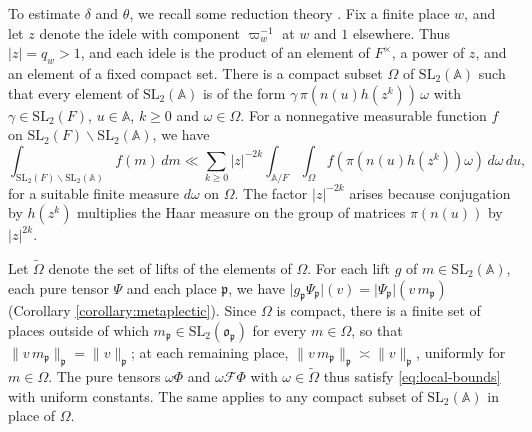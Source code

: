 \documentclass[reqno]{amsart}
\theoremstyle{plain}
\theoremstyle{definition}
\theoremstyle{itplain}
\numberwithin{equation}{section}
\numberwithin{theorem}{section}
\begin{document}
To estimate $\delta$ and $\theta$, we recall some reduction theory \cite[I.2.1]{MR1361168}.  Fix a finite place $w$, and let $z$ denote the idele with component $\varpi_w^{-1}$ at $w$ and $1$ elsewhere.  Thus $\lvert z \rvert = q_w > 1$, and each idele is the product of an element of $F^\times$, a power of $z$, and an element of a fixed compact set.  There is a compact subset $\Omega$ of $\mathrm{SL}_2(\mathbb{A})$ such that every element of $\mathrm{SL}_2(\mathbb{A})$ is of the form $\gamma \, \pi(n(u) h(z^k)) \, \omega$ with $\gamma \in \mathrm{SL}_2(F)$, $u \in \mathbb{A}$, $k \geq 0$ and $\omega \in \Omega$.  For a nonnegative measurable function $f$ on $\mathrm{SL}_2(F) \backslash \mathrm{SL}_2(\mathbb{A})$, we have
\begin{equation}\label{eq:siegel}
  \int_{\mathrm{SL}_2(F) \backslash \mathrm{SL}_2(\mathbb{A})} f(m) \, d m
  \ll
  \sum_{k \geq 0} \lvert z \rvert^{-2 k}
  \int_{\mathbb{A} / F} \int_{\Omega} f(\pi(n(u) h(z^k)) \omega) \, d \omega \, d u,
\end{equation}
for a suitable finite measure $d \omega$ on $\Omega$.  The factor $\lvert z \rvert^{-2 k}$ arises because conjugation by $h(z^k)$ multiplies the Haar measure on the group of matrices $\pi(n(u))$ by $\lvert z \rvert^{2 k}$.

Let $\tilde{\Omega}$ denote the set of lifts of the elements of $\Omega$.  For each lift $g$ of $m \in \mathrm{SL}_2(\mathbb{A})$, each pure tensor $\Psi$ and each place $\mathfrak{p}$, we have $\lvert g_{\mathfrak{p}} \Psi_{\mathfrak{p}} \rvert(v) = \lvert \Psi_{\mathfrak{p}} \rvert(v \, m_{\mathfrak{p}})$ (Corollary \ref{corollary:metaplectic}).  Since $\Omega$ is compact, there is a finite set of places outside of which $m_{\mathfrak{p}} \in \mathrm{SL}_2(\mathfrak{o}_{\mathfrak{p}})$ for every $m \in \Omega$, so that $\lVert v \, m_{\mathfrak{p}} \rVert_{\mathfrak{p}} = \lVert v \rVert_{\mathfrak{p}}$; at each remaining place, $\lVert v \, m_{\mathfrak{p}} \rVert_{\mathfrak{p}} \asymp \lVert v \rVert_{\mathfrak{p}}$, uniformly for $m \in \Omega$.  The pure tensors $\omega \Phi$ and $\omega \mathcal{F} \Phi$ with $\omega \in \tilde{\Omega}$ thus satisfy \eqref{eq:local-bounds} with uniform constants.  The same applies to any compact subset of $\mathrm{SL}_2(\mathbb{A})$ in place of $\Omega$.
\end{document}
